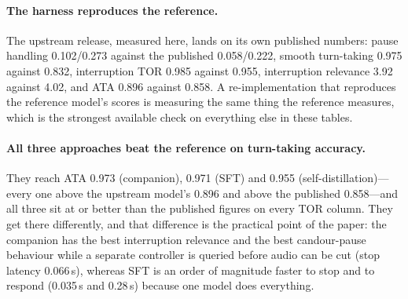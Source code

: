 \documentclass[conference]{IEEEtran}
\begin{document}
\begin{table}[t]
\centering
\caption{Full-Duplex-Bench in English (same harness, same scenario sizes). English
is out-of-distribution for all four trained models---they are fine-tuned on pt-BR
only---so this measures transfer of the protocol, not language skill.}
\label{tab:fdb2}
\footnotesize
{}
\end{table}

\paragraph{The harness reproduces the reference.} The upstream release, measured
here, lands on its own published numbers: pause handling 0.102/0.273 against the
published 0.058/0.222, smooth turn-taking 0.975 against 0.832, interruption TOR
0.985 against 0.955, interruption relevance 3.92 against 4.02, and ATA 0.896
against 0.858. A re-implementation that reproduces the reference model's scores is
measuring the same thing the reference measures, which is the strongest available
check on everything else in these tables.

\paragraph{All three approaches beat the reference on turn-taking accuracy.} They
reach ATA 0.973 (companion), 0.971 (SFT) and 0.955 (self-distillation)---every one
above the upstream model's 0.896 and above the published 0.858---and all three sit
at or better than the published figures on every TOR column. They get there
differently, and that difference is the practical point of the paper: the
companion has the best interruption relevance and the best candour-pause behaviour
while a separate controller is queried before audio can be cut (stop latency
0.066\,s), whereas SFT is an order of magnitude faster to stop and to respond
(0.035\,s and 0.28\,s) because one model does everything.
\end{document}
